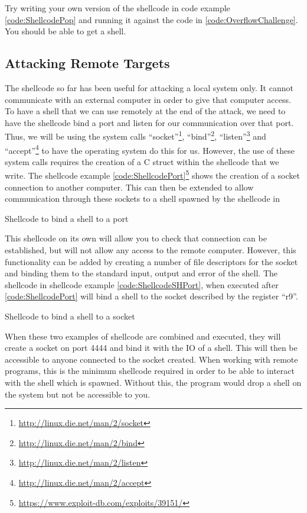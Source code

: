 			Try writing your own version of the shellcode in code example \ref{code:ShellcodePop} and running it against the code in \ref{code:OverflowChallenge}. You should be able to get a shell.

			\subsection{Attacking Remote Targets}
				The shellcode so far has been useful for attacking a local system only. It cannot communicate with an external computer in order to give that computer access.
				To have a shell that we can use remotely at the end of the attack, we need to have the shellcode bind a port and listen for our communication over that port.
				Thus, we will be using the system calls ``socket''\footnote{\url{http://linux.die.net/man/2/socket}},
				``bind''\footnote{\url{http://linux.die.net/man/2/bind}},
				``listen''\footnote{\url{http://linux.die.net/man/2/listen}} and
				``accept''\footnote{\url{http://linux.die.net/man/2/accept}} to have the operating system do this for us.
				However, the use of these system calls requires the creation of a C struct within the shellcode that we write.
				The shellcode example \ref{code:ShellcodePort}\footnote{\url{https://www.exploit-db.com/exploits/39151/}} shows the creation of a socket connection to another computer.
				This can then be extended to allow communication through these sockets to a shell spawned by the shellcode in %
				\begin{code}
					\caption{Shellcode to bind a shell to a port}
					\label{code:ShellcodePort}
				\end{code}
				This shellcode on its own will allow you to check that connection can be established, but will not allow any access to the remote computer.
				However, this functionality can be added by creating a number of file descriptors for the socket and binding them to the standard input, output and error of the shell.
				The shellcode in shellcode example \ref{code:ShellcodeSHPort}, when executed after \ref{code:ShellcodePort} will bind a shell to the socket described by the register ``r9''.
				\begin{code}
					\asmcode{./ShellcodeSHPort.asm}
					\caption{Shellcode to bind a shell to a socket}
					\label{code:ShellcodeSHPort}
				\end{code}
				When these two examples of shellcode are combined and executed, they will create a socket on port 4444 and bind it with the IO of a shell.
				This will then be accessible to anyone connected to the socket created.
				When working with remote programs, this is the minimum shellcode required in order to be able to interact with the shell which is spawned.
				Without this, the program would drop a shell on the system but not be accessible to you.

